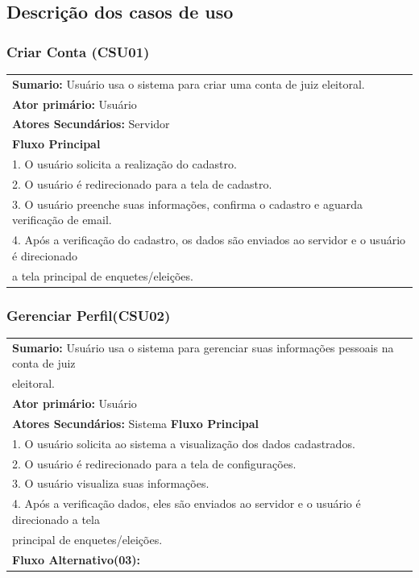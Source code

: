 \documentclass[a4paper,12pt]{article}
\begin{document}
\subsection*{Descrição dos casos de uso}
\markright{}

\begin{center}
{\subsubsection*{Criar Conta (CSU01)}}
\end{center}
\markright{}
\begin{tabular}{|l|}\hline
	{\textbf{Sumario:}} Usuário usa o sistema para criar uma conta de juiz eleitoral. \\
	{\textbf{Ator primário:}} Usuário \\
	{\textbf{Atores Secundários:}} Servidor\\
	{\textbf{Fluxo Principal}}\\
	1. O usuário solicita a realização do cadastro.\\
	2. O usuário é redirecionado para a tela de cadastro. \\
	3. O usuário preenche suas informações, confirma o cadastro e aguarda verificação de email.\\
	4. Após a verificação do cadastro, os dados são enviados ao servidor e o usuário é direcionado\\ a tela principal de enquetes/eleições.\\
	\hline
\end{tabular}

\begin{center}
	{\subsubsection*{Gerenciar Perfil(CSU02)}}
\end{center}
\markright{}
\begin{tabular}{|l|}\hline
	{\textbf{Sumario:}} Usuário usa o sistema para gerenciar suas informações pessoais na conta de juiz\\ eleitoral. \\
	{\textbf{Ator primário:}} Usuário \\
	{\textbf{Atores Secundários:}} Sistema
	{\textbf{Fluxo Principal}}\\
	1. O usuário solicita ao sistema a visualização dos dados cadastrados.\\
	2. O usuário é redirecionado para a tela de configurações. \\
	3. O usuário visualiza suas informações. \\
	4. Após a verificação dados, eles são enviados ao servidor e o usuário é direcionado a tela\\ principal de enquetes/eleições.\\
	{\textbf{Fluxo Alternativo(03):}}\\
	\hline
\end{tabular}
\end{document}
